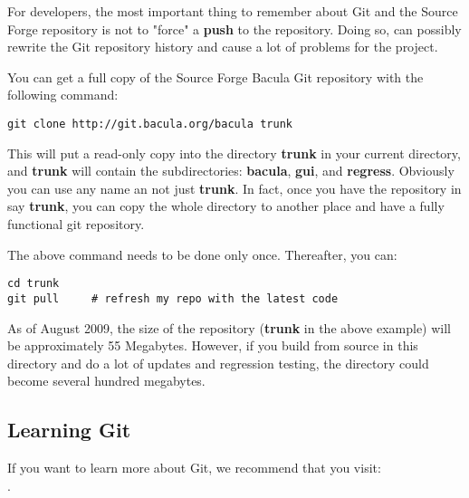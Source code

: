For developers, the most important thing to remember about Git and
the Source Forge repository is not to "force" a {\bf push} to the
repository. Doing so, can possibly rewrite
the Git repository history and cause a lot of problems for the 
project.

You can get a full copy of the Source Forge Bacula Git repository with the
following command:

\begin{verbatim}
git clone http://git.bacula.org/bacula trunk
\end{verbatim}

This will put a read-only copy into the directory {\bf trunk} 
in your current directory, and {\bf trunk} will contain
the subdirectories: {\bf bacula}, {\bf gui}, and {\bf regress}.
Obviously you can use any name an not just {\bf trunk}.  In fact,
once you have the repository in say {\bf trunk}, you can copy the
whole directory to another place and have a fully functional
git repository.

The above command needs to be done only once. Thereafter, you can:

\begin{verbatim}
cd trunk
git pull     # refresh my repo with the latest code
\end{verbatim}

As of August 2009, the size of the repository ({\bf trunk} in the above
example) will be approximately 55 Megabytes.  However, if you build
from source in this directory and do a lot of updates and regression
testing, the directory could become several hundred megabytes.

\subsection{Learning Git}
If you want to learn more about Git, we recommend that you visit:\\
.

